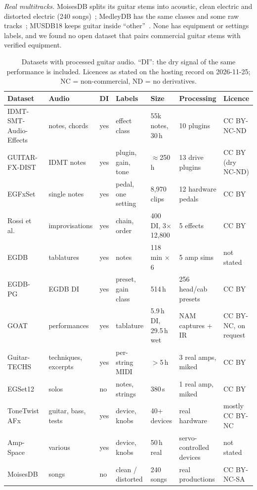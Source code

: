 \emph{Real multitracks.} MoisesDB splits its guitar stems into acoustic, clean
electric and distorted electric (240 songs)~\cite{pereira2023moisesdb};
MedleyDB has the same classes and some raw tracks~\cite{bittner2014medleydb};
MUSDB18 keeps guitar inside ``other''~\cite{rafii2017musdb18}. None has
equipment or settings labels, and we found no open dataset that pairs
commercial guitar stems with verified equipment.

\begin{table}[t]
\centering
\caption{Datasets with processed guitar audio. ``DI'': the dry signal of the
same performance is included. Licences as stated on the hosting record on
2026-11-25; NC = non-commercial, ND = no derivatives.}
\label{tab:datasets}
\scriptsize
\setlength{\tabcolsep}{3pt}
\begin{tabular}{@{}lllllll@{}}
\toprule
Dataset & Audio & DI & Labels & Size & Processing & Licence \\
\midrule
IDMT-SMT-Audio-Effects~\cite{stein2010aes} & notes, chords & yes & effect class & 55k notes, 30\,h & 10 plugins & CC BY-NC-ND \\
GUITAR-FX-DIST~\cite{comunita2021guitar} & IDMT notes & yes & plugin, gain, tone & $\approx$250\,h & 13 drive plugins & CC BY (dry NC-ND) \\
EGFxSet~\cite{pedroza2022egfxset} & single notes & yes & pedal, one setting & 8,970 clips & 12 hardware pedals & CC BY \\
Rossi et al.~\cite{rossi2025automatic} & improvisations & yes & chain, order & 400 DI, 3$\times$12,800 & 5 effects & CC BY \\
EGDB~\cite{chen2022egdb} & tablatures & yes & notes & 118\,min $\times$ 6 & 5 amp sims & not stated \\
EGDB-PG~\cite{chen2026toward} & EGDB DI & yes & preset, gain class & 514\,h & 256 head/cab presets & CC BY \\
GOAT~\cite{loth2025goat} & performances & yes & tablature & 5.9\,h DI, 29.5\,h wet & NAM captures + IR & CC BY-NC, on request \\
Guitar-TECHS~\cite{pedroza2025guitartechs} & techniques, excerpts & yes & per-string MIDI & $>$5\,h & 3 real amps, miked & CC BY \\
EGSet12~\cite{pedroza2024egset12} & solos & no & notes, strings & 380\,s & 1 real amp, miked & CC BY \\
ToneTwist AFx~\cite{comunita2025differentiable} & guitar, bass, tests & yes & device, knobs & 40+ devices & real hardware & mostly CC BY-NC \\
Amp-Space~\cite{naradowsky2021ampspace} & various & yes & device, knobs & 50\,h real & servo-controlled devices & not stated \\
MoisesDB~\cite{pereira2023moisesdb} & songs & no & clean / distorted & 240 songs & real productions & CC BY-NC-SA \\
\bottomrule
\end{tabular}
\end{table}

